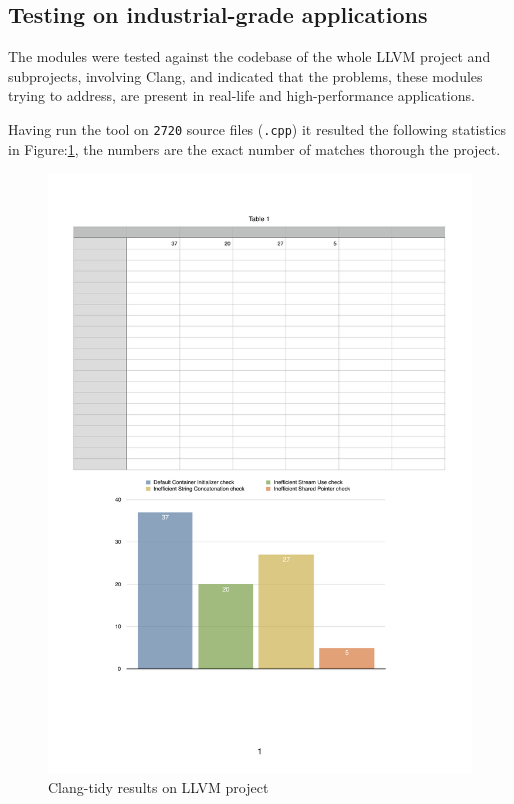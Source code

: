 \subsection{Testing on industrial-grade applications}
\par The modules were tested against the codebase of the whole LLVM project and subprojects, involving Clang, and indicated that the problems, these modules trying to address, are present in real-life and high-performance applications.
\par Having run the tool on \verb|2720| source files (\verb|.cpp|) it resulted the following statistics in Figure:\ref{clang_tidy_results}, the numbers are the exact number of matches thorough the project.
\begin{figure}[h]
	\caption{Clang-tidy results on LLVM project}
	\label{clang_tidy_results}
	\includegraphics[scale=0.7]{images/run_tidy_result.pdf}
\end{figure}
